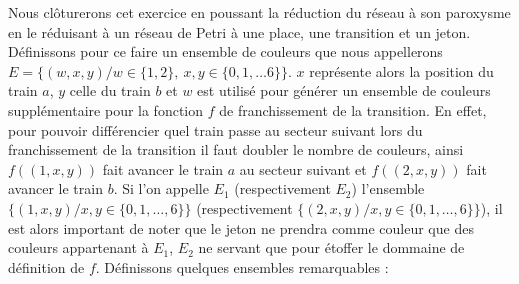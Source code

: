 Nous clôturerons cet exercice en poussant la réduction du réseau à son paroxysme en le réduisant à
un réseau de Petri à une place, une transition et un jeton. Définissons pour ce faire un ensemble de
couleurs que nous appellerons $E = \{(w, x, y) / w \in \{1, 2\},\ x,y \in \{0, 1, \dots 6\}\}$. $x$
représente alors la position du train $a$, $y$ celle du train $b$ et $w$ est utilisé pour générer un
ensemble de couleurs supplémentaire pour la fonction $f$ de franchissement de la transition. En
effet, pour pouvoir différencier quel train passe au secteur suivant lors du franchissement de la
transition il faut doubler le nombre de couleurs, ainsi $f((1, x, y))$ fait avancer le train $a$ au
secteur suivant et $f((2, x, y))$ fait avancer le train $b$. Si l'on appelle $E_1$ (respectivement
$E_2$) l'ensemble $\{(1, x, y) / x,y \in \{0, 1, \dots, 6\}\}$ (respectivement $\{(2, x, y) / x,y
\in \{0, 1, \dots, 6\}\}$), il est alors important de noter que le jeton ne prendra comme couleur
que des couleurs appartenant à $E_1$, $E_2$ ne servant que pour étoffer le dommaine de définition de
$f$. Définissons quelques ensembles remarquables :
